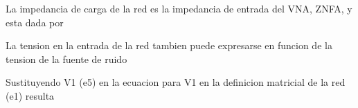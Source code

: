 \documentclass{article}
\begin{document}
\begin{maplegroup}
\mapleresult
\begin{maplelatex}
\end{maplelatex}
\end{maplegroup}
\begin{Maple Normal}{
\begin{Maple Normal}{
La impedancia de carga de la red es la impedancia de entrada del VNA, ZNFA, y esta dada por}\end{Maple Normal}

}\end{Maple Normal}

\begin{maplegroup}
\mapleresult
\begin{maplelatex}
\end{maplelatex}
\end{maplegroup}
\begin{Maple Normal}{
\begin{Maple Normal}{
La tension en la entrada de la red tambien puede expresarse en funcion de la tension de la fuente de ruido}\end{Maple Normal}

}\end{Maple Normal}

\begin{maplegroup}
\mapleresult
\begin{maplelatex}
\end{maplelatex}
\end{maplegroup}
\begin{Maple Normal}{
\begin{Maple Normal}{
Sustituyendo V1 (e5) en la ecuacion para V1 en la definicion matricial de la red (e1) resulta}\end{Maple Normal}

}\end{Maple Normal}
\end{document}
